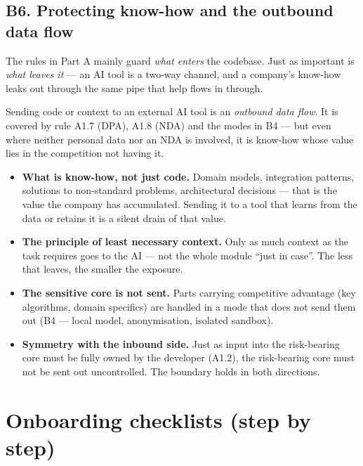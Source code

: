 \subsection{B6. Protecting know-how and the outbound data flow}

The rules in Part A mainly guard \emph{what enters} the codebase.
Just as important is \emph{what leaves it} --- an AI tool is a two-way channel, and a company's know-how leaks out through the same pipe that help flows in through.

\begin{calloutplain}[grey]
Sending code or context to an external AI tool is an \emph{outbound data flow}.
It is covered by rule A1.7 (DPA), A1.8 (NDA) and the modes in B4 --- but even where neither personal data nor an NDA is involved, it is know-how whose value lies in the competition not having it.
\end{calloutplain}

\medskip
\begin{itemize}
\item \textbf{What is know-how, not just code.}
Domain models, integration patterns, solutions to non-standard problems, architectural decisions --- that is the value the company has accumulated.
Sending it to a tool that learns from the data or retains it is a silent drain of that value.
\item \textbf{The principle of least necessary context.}
Only as much context as the task requires goes to the AI --- not the whole module \enquote{just in case}.
The less that leaves, the smaller the exposure.
\item \textbf{The sensitive core is not sent.}
Parts carrying competitive advantage (key algorithms, domain specifics) are handled in a mode that does not send them out (B4 --- local model, anonymisation, isolated sandbox).
\item \textbf{Symmetry with the inbound side.}
Just as input into the risk-bearing core must be fully owned by the developer (A1.2), the risk-bearing core must not be sent out uncontrolled.
The boundary holds in both directions.
\end{itemize}

\section{Onboarding checklists (step by step)}

